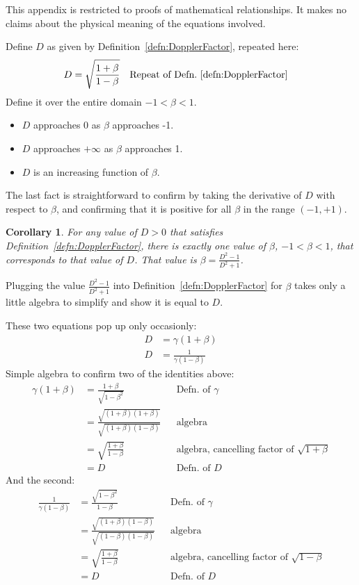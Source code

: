 \documentclass[a4paper]{article}
\theoremstyle{plain}
\newtheorem{corollary}[theorem]{Corollary}
\theoremstyle{definition}
\begin{document}
This appendix is restricted to proofs of mathematical relationships.
It makes no claims about the physical meaning of the equations
involved.

Define $D$ as given by Definition~\eqref{defn:DopplerFactor}, repeated
here:
\begin{align*}
D & = \sqrt{ \frac{1 + \beta}{1 - \beta} } & & \text{Repeat of Defn.~\eqref{defn:DopplerFactor}}
\end{align*}
Define it over the entire domain $-1 < \beta < 1$.
\begin{itemize}
\item $D$ approaches 0 as $\beta$ approaches -1.
\item $D$ approaches $+\infty$ as $\beta$ approaches 1.
\item $D$ is an increasing function of $\beta$.
\end{itemize}
The last fact is straightforward to confirm by taking the derivative
of $D$ with respect to $\beta$, and confirming that it is positive
for all $\beta$ in the range $(-1, +1)$.

\begin{corollary}
\label{cor:DdeterminesBeta}
For any value of $D > 0$ that satisfies
Definition~\eqref{defn:DopplerFactor}, there is exactly one value of
$\beta$, $-1 < \beta < 1$,
that corresponds to that value of $D$.
That value is $\beta = \frac{D^2-1}{D^2+1}$.
\end{corollary}
Plugging the value $\frac{D^2-1}{D^2+1}$ into
Definition~\eqref{defn:DopplerFactor} for $\beta$ takes only a little
algebra to simplify and show it is equal to $D$.

These two equations pop up only occasionly:
\begin{align}
D & = \gamma (1+\beta) \label{eqn:Dgammabeta1} \\
D & = \frac{1}{\gamma (1-\beta)} \label{eqn:Dgammabeta2}
\end{align}
Simple algebra to confirm two of the identities above:
\begin{align*}
\gamma (1+\beta)
  & = \frac{1+\beta}{\sqrt{1-\beta^2}} & & \text{Defn. of $\gamma$} \\
  & = \frac{\sqrt{(1+\beta)(1+\beta)}}{\sqrt{(1+\beta)(1-\beta)}} & & \text{algebra} \\
  & = \sqrt{ \frac{1+\beta}{1-\beta} } & & \text{algebra, cancelling factor of $\sqrt{1+\beta}$} \\
  & = D & & \text{Defn. of $D$}
\end{align*}
And the second:
\begin{align*}
\frac{1}{\gamma (1-\beta)}
  & = \frac{\sqrt{1-\beta^2}}{1-\beta} & & \text{Defn. of $\gamma$} \\
  & = \frac{\sqrt{(1+\beta)(1-\beta)}}{\sqrt{(1-\beta)(1-\beta)}} & & \text{algebra} \\
  & = \sqrt{ \frac{1+\beta}{1-\beta} } & & \text{algebra, cancelling factor of $\sqrt{1-\beta}$} \\
  & = D & & \text{Defn. of $D$}
\end{align*}
\end{document}
